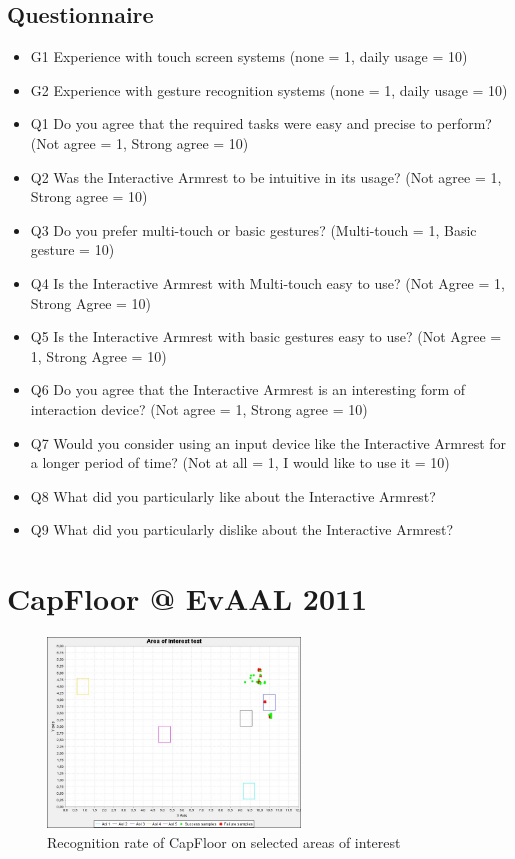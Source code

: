 \subsection{Questionnaire}
\begin{itemize}
\item G1 Experience with touch screen systems (none = 1, daily usage = 10)
\item G2 Experience with gesture recognition systems (none = 1, daily usage = 10)
\item Q1 Do you agree that the required tasks were easy and precise to perform? (Not agree = 1, Strong agree = 10)
\item Q2 Was the Interactive Armrest to be intuitive in its usage? (Not agree = 1, Strong agree = 10)
\item Q3 Do you prefer multi-touch or basic gestures?
(Multi-touch = 1, Basic gesture = 10)
\item Q4 Is the Interactive Armrest with Multi-touch easy to use? (Not Agree = 1, Strong Agree = 10)
\item Q5 Is the Interactive Armrest with basic gestures easy to use? (Not Agree = 1, Strong Agree = 10)
\item Q6 Do you agree that the Interactive Armrest is an interesting form of interaction device? (Not agree = 1, Strong agree = 10)
\item Q7 Would you consider using an input device like the Interactive Armrest for a longer period of time? (Not at all = 1, I would like to use it = 10)
\item Q8 What did you particularly like about the Interactive Armrest?
\item Q9 What did you particularly dislike about the Interactive Armrest?
\end{itemize}

\section{CapFloor @ EvAAL 2011}
\begin{figure}[ht]
\centering
\includegraphics[width=0.6\textwidth]{images/eval_evaal_aoi}
\caption{Recognition rate of CapFloor on selected areas of interest}
\label{fig:eval_evaal_aoi}
\end{figure}

